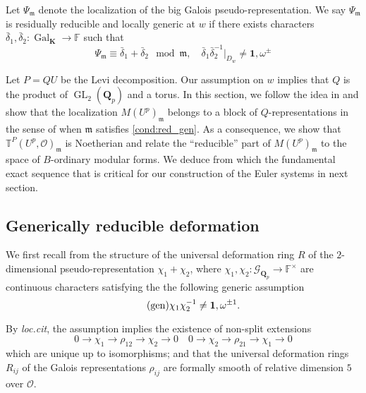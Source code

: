 \documentclass[leqno]{amsart}
\theoremstyle{definition}
\theoremstyle{remark}
\newcommand{\id}{\mathbf{1}}
\newcommand{\oo}{\mathcal{O}}
\newcommand{\fF}{\mathbb{F}} %
\newcommand{\Qp}{\mathbf{Q}_p}
\DeclareMathOperator{\GL}{GL}
\DeclareMathOperator{\Gal}{Gal}
\newcommand{\fm}{\mathfrak{m}}
\newcommand{\Gp}{\mathcal{G}_{\Qp}} %
\newcommand{\K}{{\mathbf{K}}} %
\newcommand{\TT}{\mathbb{T}} %
\begin{document}
Let  $\Psi_{\fm}$ denote 
the localization of the big Galois pseudo-representation.
We say $\Psi_{\fm}$ is 
residually reducible and locally generic at $w$ if
there exists characters
$\bar{\delta}_1, \bar{\delta}_2\colon \Gal_{\K}\to \fF$
such that 
\begin{equation}\tag{red.gen}\label{cond:red_gen}
	\Psi_\fm\equiv \bar{\delta}_1+\bar{\delta}_2
	\mod \fm,\quad
	\bar{\delta}_1\bar{\delta}_2^{-1} \vert_{D_w}
	\neq \id,\omega^{\pm}
\end{equation}

Let $P=QU$ be the Levi decomposition.
Our assumption on $w$ implies that
$Q$ is the product of  $\GL_2(\Qp)$
and a torus.
In this section,
we follow the idea in \cite{urban}
and show that the localization
$M(U^p)_{\fm}$ belongs to a block
of $Q$-representations in the sense of  \cite{pask}
when  $\fm$ satisfies \eqref{cond:red_gen}.
As a consequence,
we show that $\TT^P(U^p,\oo)_{\fm}$
is Noetherian
and relate the ``reducible'' part of 
$M(U^p)_{\fm}$ to the space of 
$B$-ordinary modular forms.
We deduce from which
the fundamental exact sequence
that is critical for our
construction of the Euler systems
in next section.

\subsection{Generically reducible deformation}



We first recall from \cite[\S B.1]{pask}
the structure of the universal deformation ring 
$R$ of the $2$-dimensional pseudo-representation 
$\chi_1+\chi_2$,
where $\chi_1,\chi_2\colon \Gp\to \fF^\times$ 
are continuous characters satisfying the 
the following generic assumption
\begin{equation}\label{cond:generic}\tag{\text{gen}}
	\chi_1\chi_2^{-1}\neq \id,\omega^{\pm1}.
\end{equation}

By \textit{loc.cit}, the assumption
implies the existence of non-split extensions
\begin{equation*}
    0\to \chi_1\to \rho_{12}\to \chi_2\to 0\quad
    0\to \chi_2\to \rho_{21}\to \chi_1\to 0
\end{equation*}
which are unique up to isomorphisms;
and that the universal deformation rings
$R_{ij}$ of the Galois representations $\rho_{ij}$
are formally smooth of relative dimension $5$ over $\oo$.
\end{document}
